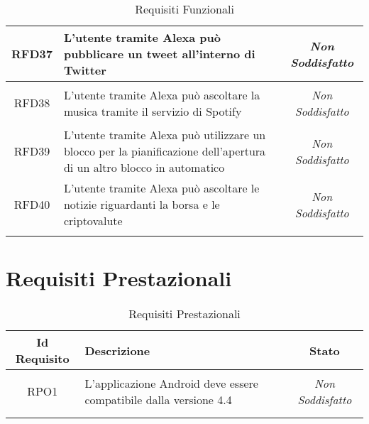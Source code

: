 \begin{longtable}{|c|>{\centering}m{7cm}|c|}
	\hypertarget{RFD37}{RFD37} & L'utente tramite Alexa può pubblicare un tweet all'interno di Twitter & \textit{Non Soddisfatto}\\ \hline
	
	\hypertarget{RFD38}{RFD38} & L'utente tramite Alexa può ascoltare la musica tramite il servizio di Spotify & \textit{Non Soddisfatto}\\ \hline
	
	\hypertarget{RFD39}{RFD39} & L'utente tramite Alexa può utilizzare un blocco per la pianificazione dell'apertura di un altro blocco in automatico & \textit{Non Soddisfatto}\\ \hline
	
	\hypertarget{RFD40}{RFD40} & L'utente tramite Alexa può ascoltare le notizie riguardanti la borsa e le criptovalute & \textit{Non Soddisfatto}\\ \hline
	
	\caption[Requisiti Funzionali]{Requisiti Funzionali}
	\label{tabella:req0}
\end{longtable}
\clearpage
\section{Requisiti Prestazionali}
\normalsize
\begin{longtable}{|c|>{\centering}m{7cm}|c|}
	\hline 
	\textbf{Id Requisito} & \textbf{Descrizione} & \textbf{Stato}\\
	\hline
	\endhead
	\hypertarget{RPO1}{RPO1} & L'applicazione Android deve essere compatibile dalla versione 4.4 & \textit{Non Soddisfatto}\\ \hline
	
	\caption[Requisiti Prestazionali]{Requisiti Prestazionali}
	\label{tabella:req1}
\end{longtable}
\clearpage
